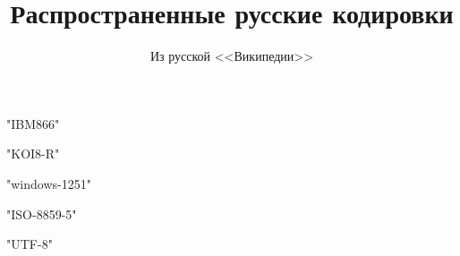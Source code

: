 \documentclass{article}
\title{Распространенные русские кодировки}
\author{Из русской <<Википедии>>}
\date{}
\begin{document}
\maketitle

\tableofcontents


\XeTeXdefaultencoding "IBM866"


\XeTeXdefaultencoding "KOI8-R"


\XeTeXdefaultencoding "windows-1251"


\XeTeXdefaultencoding "ISO-8859-5"


\XeTeXdefaultencoding "UTF-8"
\end{document}

